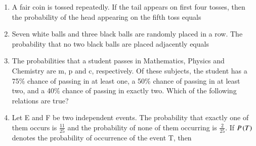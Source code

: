 \documentclass[journal,12pt,twocolumn,article]{IEEEtran}
\theoremstyle{remark}
\begin{document}
\begin{enumerate}[start = 3]
\begin{enumerate}
\end{enumerate}
\item A fair coin is tossed repeatedly. If the tail appears on first four tosses, then the probability of the head appearing on the fifth toss equals
\hfill{}
\begin{enumerate}
\end{enumerate}
\item Seven white balls and three black balls are randomly placed in a row. The probability that no two black balls are placed adjacently equals
\hfill{}
\begin{enumerate}
\end{enumerate}
\item The probabilities that a student passes in Mathematics, Physics and Chemistry are m, p and c, respectively. Of these subjects, the student has a 75\% chance of passing in at least one, a 50\% chance of passing in at least two, and a 40\% chance of passing in exactly two. Which of the following relations are true?
\hfill{}
\begin{enumerate}
\end{enumerate}
\item Let E and F be two independent events. The probability that exactly one of them occurs is $\frac{11}{25}$ and the probability of none of them occurring is $\frac{2}{25}$. If $P\left(T\right)$ denotes the probability of occurrence of the event T, then

\end{enumerate}
\end{document}
